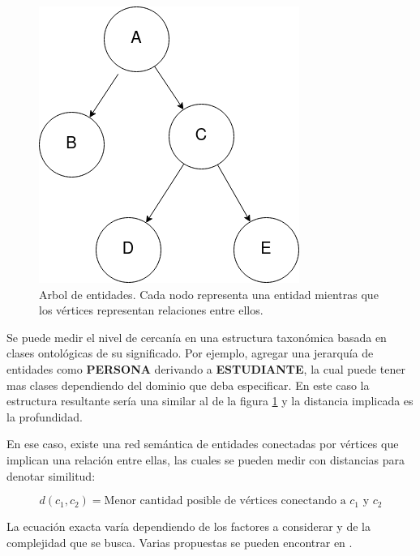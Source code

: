 \begin{figure}
    \centering
    \includegraphics[scale=0.5]{images/2/arbol-simple}
    \caption{Arbol de entidades. Cada nodo representa una entidad mientras que los vértices representan relaciones entre ellos.}
    \label{fig:arbol-entidades}
\end{figure}


Se puede medir el nivel de cercanía en una estructura taxonómica basada en clases ontológicas de su significado. Por ejemplo, agregar una jerarquía de entidades como \textbf{PERSONA} derivando a \textbf{ESTUDIANTE}, la cual puede tener mas clases dependiendo del dominio que deba especificar. En este caso la estructura resultante sería una similar al de la figura \ref{fig:arbol-entidades} y la distancia implicada es la profundidad.


En ese caso, existe una red semántica de entidades conectadas por vértices que implican una relación entre ellas, las cuales se pueden medir con distancias para denotar similitud:

$$
d(c_1, c_2) = \text{Menor cantidad posible de vértices conectando a } c_1 \text{ y } c_2
$$

La ecuación exacta varía dependiendo de los factores a considerar y de la complejidad que se busca. Varias propuestas se pueden encontrar en \cite{batetsanchesvalls2010semantic}.
